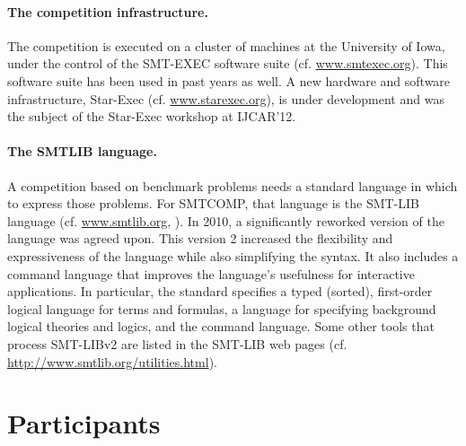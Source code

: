 \documentclass{llncs}
\begin{document}
\paragraph{The competition infrastructure.} The competition is executed on a cluster of machines at the University of Iowa, under the control of the SMT-EXEC software suite (cf. \url{www.smtexec.org}). This software suite has been used in past years as well. A new hardware and software infrastructure, Star-Exec (cf. \url{www.starexec.org}), is under development and was the subject of the Star-Exec workshop at IJCAR'12.

\paragraph{The SMTLIB language.} A competition based on benchmark problems needs a standard language in which to express those problems.
For SMTCOMP, that language is the SMT-LIB language (cf. \url{www.smtlib.org}, \cite{BarST-SMT-10} \cite{Cok-SMTLIBTutorial-2011}). 
In 2010, a significantly reworked version of the language was agreed upon.
This version 2 increased the flexibility and expressiveness of the language while also simplifying the syntax. 
It also includes a command language that improves the language's usefulness for interactive applications.
In particular, the standard specifies a typed (sorted), first-order logical language for terms and formulas, a language for specifying background logical theories and logics, and the command language. Some other tools that process SMT-LIBv2 are listed in the SMT-LIB web pages (cf. \url{http://www.smtlib.org/utilities.html}).

\section{Participants}
\end{document}
